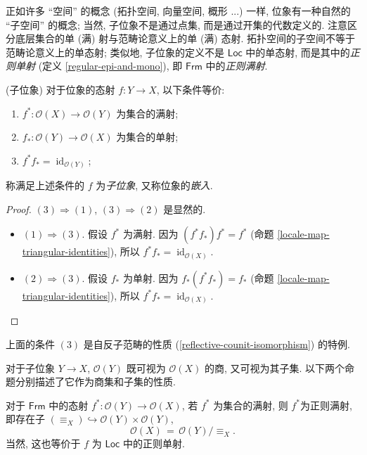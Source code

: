 正如许多 ``空间'' 的概念 (拓扑空间, 向量空间, 概形 ...) 一样, 位象有一种自然的 ``子空间'' 的概念; 当然, 子位象不是通过点集, 而是通过开集的代数定义的. 注意区分底层集合的单 (满) 射与范畴论意义上的单 (满) 态射. 拓扑空间的子空间不等于范畴论意义上的单态射; 类似地, 子位象的定义不是 $\mathsf {Loc}$ 中的单态射, 而是其中的\emph{正则单射} (定义 \ref{regular-epi-and-mono}), 即 $\mathsf {Frm}$ 中的\emph{正则满射}.

\begin{propdef}
	[label={sublocales}]
	{(子位象)}
	对于位象的态射 $f\colon Y\to X$, 以下条件等价:
	\begin{enumerate}
		[(1)]
		\item $f^*\colon \mathcal O(X)\to\mathcal O(Y)$ 为集合的满射;
		\item $f_*\colon \mathcal O(Y)\to\mathcal O(X)$ 为集合的单射;
		\item $f^*f_* = \operatorname{id}_{\mathcal O(Y)}$;
	\end{enumerate}
	称满足上述条件的 $f$ 为\emph{子位象}, 又称位象的\emph{嵌入}.
\end{propdef}
\begin{proof}
	$(3)\Rightarrow (1)$, $(3)\Rightarrow (2)$ 是显然的.
	\begin{itemize}
		\item $(1)\Rightarrow (3)$. 假设 $f^*$ 为满射. 因为 $(f^*f_*)f^* = f^*$ (命题 \ref{locale-map-triangular-identities}), 所以 $f^*f_*=\operatorname{id}_{\mathcal O(X)}$.
		\item $(2)\Rightarrow (3)$. 假设 $f_*$ 为单射. 因为 $f_*(f^*f_*) = f_*$ (命题 \ref{locale-map-triangular-identities}), 所以 $f^*f_*=\operatorname{id}_{\mathcal O(X)}$.
	\end{itemize}
\end{proof}

上面的条件 $(3)$ 是自反子范畴的性质 (\ref{reflective-counit-isomorphism}) 的特例.

对于子位象 $Y\to X$, $\mathcal O(Y)$ 既可视为 $\mathcal O(X)$ 的商, 又可视为其子集. 以下两个命题分别描述了它作为商集和子集的性质.


\begin{prop}
	{}
	对于 $\mathsf {Frm}$ 中的态射 $f^*\colon \mathcal O(Y)\to \mathcal O(X)$, 若 $f^*$ 为集合的满射, 则 $f^*$为正则满射, 即存在子\fm{} $(\equiv_X)\hookrightarrow \mathcal O(Y)\times\mathcal O(Y)$, $$\mathcal O(X) \,=\, \mathcal O(Y) \big/ \!\equiv_X.$$
	当然, 这也等价于 $f$ 为 $\mathsf {Loc}$ 中的正则单射.
\end{prop}

